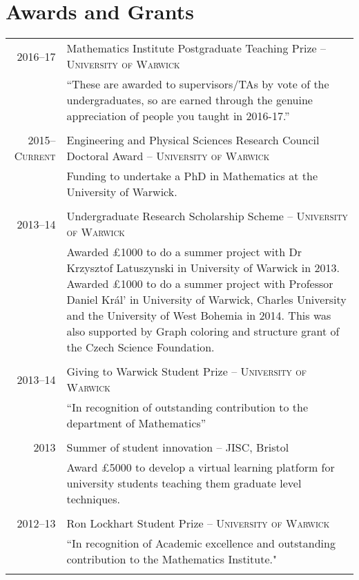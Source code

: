 \documentclass[a4paper,10pt]{article}
\begin{document}
\section{Awards and Grants}
\begin{tabular}{r|p{15cm}}
	\textsc{2016--17}& Mathematics Institute Postgraduate Teaching Prize -- \textsc{University of Warwick}\\&\footnotesize{``These are awarded to supervisors/TAs by vote of the undergraduates, so are earned through the genuine appreciation of people you taught in 2016-17.”}\\\multicolumn{2}{c}{} \\
	\textsc{2015--Current}& Engineering and Physical Sciences Research Council Doctoral Award -- \textsc{University of Warwick}\\&\footnotesize{Funding to undertake a PhD in Mathematics at the University of Warwick.}\\\multicolumn{2}{c}{} \\
	\textsc{2013--14}& Undergraduate Research Scholarship Scheme -- \textsc{University of Warwick}\\&\footnotesize{Awarded £1000 to do a summer project with Dr Krzysztof Latuszynski in University of Warwick in 2013. Awarded £1000 to do a summer project with Professor Daniel Král' in University of Warwick, Charles University and the University of West Bohemia in 2014. This was also supported by Graph coloring and structure grant of the Czech Science Foundation.}\\\multicolumn{2}{c}{} \\
	\textsc{2013--14}& Giving to Warwick Student Prize -- \textsc{University of Warwick}\\&\footnotesize{``In recognition of outstanding contribution to the department of Mathematics”}\\\multicolumn{2}{c}{} \\
	\textsc{2013}& Summer of student innovation -- \textsc{JISC}, Bristol\\&\footnotesize{Award £5000 to develop a virtual learning platform for university students teaching them graduate level techniques.}\\\multicolumn{2}{c}{} \\
	\textsc{2012--13}& Ron Lockhart Student Prize -- \textsc{University of Warwick}\\&\footnotesize{``In recognition of Academic excellence and outstanding contribution to the Mathematics Institute."}\\\multicolumn{2}{c}{} \\
\end{tabular}
\end{document}
